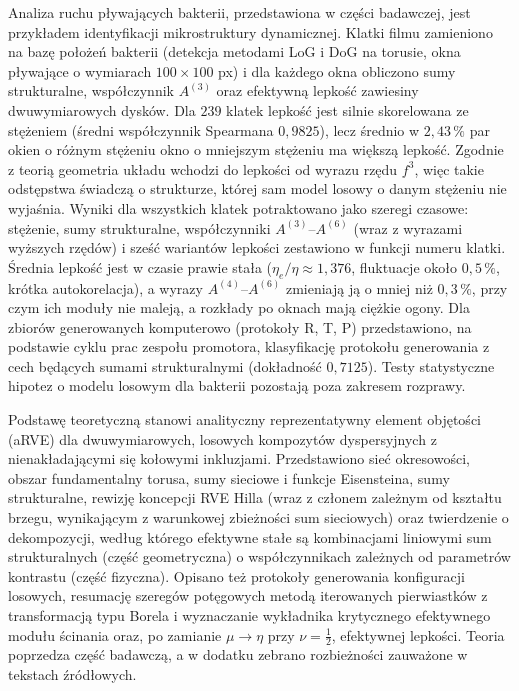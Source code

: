 \documentclass[12pt,a4paper,twoside,openright]{report}
\theoremstyle{definition}
\theoremstyle{remark}
\newcommand{\ziel}[1]{{\color{green!50!black}#1}}
\begin{document}
Analiza ruchu pływających bakterii, przedstawiona w części badawczej, jest przykładem identyfikacji mikrostruktury dynamicznej. Klatki filmu zamieniono na bazę położeń bakterii (detekcja metodami LoG i DoG na torusie, okna pływające o wymiarach $100\times100$ px) i dla każdego okna obliczono sumy strukturalne, współczynnik $A^{(3)}$ oraz efektywną lepkość zawiesiny dwuwymiarowych dysków. Dla $239$ klatek lepkość jest silnie skorelowana ze stężeniem (średni współczynnik Spearmana $0{,}9825$), lecz średnio w $2{,}43\,\%$ par okien o różnym stężeniu okno o mniejszym stężeniu ma większą lepkość. Zgodnie z teorią geometria układu wchodzi do lepkości od wyrazu rzędu $f^3$, więc takie odstępstwa świadczą o strukturze, której sam model losowy o danym stężeniu nie wyjaśnia. \ziel{Wyniki dla wszystkich klatek potraktowano jako szeregi czasowe: stężenie, sumy strukturalne, współczynniki $A^{(3)}$--$A^{(6)}$ (wraz z wyrazami wyższych rzędów) i sześć wariantów lepkości zestawiono w funkcji numeru klatki. Średnia lepkość jest w czasie prawie stała ($\eta_e/\eta\approx1{,}376$, fluktuacje około $0{,}5\,\%$, krótka autokorelacja), a wyrazy $A^{(4)}$--$A^{(6)}$ zmieniają ją o mniej niż $0{,}3\,\%$, przy czym ich moduły nie maleją, a rozkłady po oknach mają ciężkie ogony.} Dla zbiorów generowanych komputerowo (protokoły R, T, P) przedstawiono, na podstawie cyklu prac zespołu promotora, klasyfikację protokołu generowania z cech będących sumami strukturalnymi (dokładność $0{,}7125$). Testy statystyczne hipotez o modelu losowym dla bakterii pozostają poza zakresem rozprawy.

Podstawę teoretyczną stanowi analityczny reprezentatywny element objętości (aRVE) dla dwuwymiarowych, losowych kompozytów dyspersyjnych z nienakładającymi się kołowymi inkluzjami. Przedstawiono sieć okresowości, obszar fundamentalny torusa, sumy sieciowe i funkcje Eisensteina, sumy strukturalne, rewizję koncepcji RVE Hilla (wraz z członem zależnym od kształtu brzegu, wynikającym z warunkowej zbieżności sum sieciowych) oraz twierdzenie o dekompozycji, według którego efektywne stałe są kombinacjami liniowymi sum strukturalnych (część geometryczna) o współczynnikach zależnych od parametrów kontrastu (część fizyczna). Opisano też protokoły generowania konfiguracji losowych, resumację szeregów potęgowych metodą iterowanych pierwiastków z transformacją typu Borela i wyznaczanie wykładnika krytycznego efektywnego modułu ścinania oraz, po zamianie $\mu\to\eta$ przy $\nu=\tfrac12$, efektywnej lepkości. Teoria poprzedza część badawczą, a w dodatku zebrano rozbieżności zauważone w tekstach źródłowych.
\end{document}

